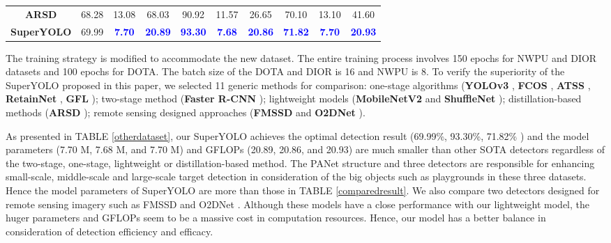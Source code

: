 \begin{table*}[htpb]
{\begin{tabular}{c|ccc|ccc|ccc}
			\textbf{ARSD \cite{yang2022adaptive}}         & 68.28 & 13.08     & 68.03    & 90.92 & 11.57     & 26.65    & 70.10 & 13.10     & 41.60           \\
			\textbf{SuperYOLO} & 69.99 & \textbf{\textcolor{blue}{7.70}} & \textbf{\textcolor{blue}{20.89} }& \textbf{\textcolor{blue}{93.30}}   & \textbf{\textcolor{blue}{7.68}} & \textbf{\textcolor{blue}{20.86} }&  \textbf{\textcolor{blue}{71.82}} & \textbf{\textcolor{blue}{7.70}} & \textbf{\textcolor{blue}{20.93}} \\
\bottomrule[1.2pt]
	\end{tabular}}
	\vspace{-0.1in}
\end{table*} 
The training strategy is modified to accommodate the new dataset. The entire training process involves 150 epochs for NWPU and DIOR datasets and 100 epochs for DOTA. The batch size of the DOTA and DIOR is 16 and NWPU is 8. To verify the superiority of the SuperYOLO proposed in this paper, we selected 11 generic methods for comparison: one-stage algorithms (\textbf{YOLOv3} \cite{redmon2018yolov3},  \textbf{FCOS} \cite{tian2019fcos},  \textbf{ATSS} \cite{zhang2020bridging}, \textbf{RetainNet} \cite{lin2017focal}, \textbf{GFL} \cite{li2020generalized}); two-stage method (\textbf{Faster R-CNN} \cite{ren2016faster}); lightweight models (\textbf{MobileNetV2} \cite{sandler2018mobilenetv2} and \textbf{ShuffleNet} \cite{zhang2018shufflenet}); distillation-based methods (\textbf{ARSD} \cite{yang2022adaptive}); remote sensing designed approaches (\textbf{FMSSD} \cite{2020FMSSD} and \textbf{O2DNet} \cite{WEI2020268}).

As presented in TABLE \ref{otherdataset}, our SuperYOLO achieves the optimal detection result (69.99\%, 93.30\%, 71.82\% ) and the model parameters (7.70 M, 7.68 M, and 7.70 M) and GFLOPs (20.89, 20.86, and 20.93) are much smaller than other SOTA detectors regardless of the two-stage, one-stage, lightweight or distillation-based method. The PANet structure and three detectors are responsible for enhancing small-scale, middle-scale and large-scale target detection in consideration of the big objects such as playgrounds in these three datasets. Hence the model parameters of SuperYOLO are more than those in TABLE \ref{comparedresult}. We also compare two detectors designed for remote sensing imagery such as FMSSD \cite{2020FMSSD} and O2DNet \cite{WEI2020268}. Although these models have a close performance with our lightweight model, the huger parameters and GFLOPs seem to be a massive cost in computation resources. Hence, our model has a better balance in consideration of detection efficiency and efficacy.



